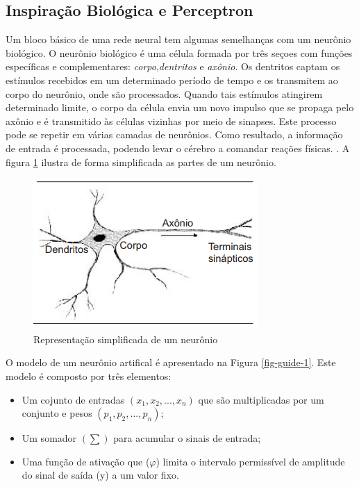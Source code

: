 \subsection{Inspiração Biológica e Perceptron}

Um bloco básico de uma rede neural tem algumas semelhanças com um neurônio biológico. O neurônio biológico é uma célula formada por três seçoes com funções específicas e complementares: \textit{corpo},\textit{dentritos} e \textit{axônio}. Os dentritos captam os estímulos recebidos em um determinado período de tempo e os transmitem ao corpo do neurônio, onde são processados. Quando tais estímulos atingirem determinado limite, o corpo da célula envia um novo impulso que se propaga pelo axônio e é transmitido às células vizinhas por meio de sinapses.  Este processo pode se repetir em várias camadas de neurônios. Como resultado, a informação de entrada é processada, podendo levar o cérebro a comandar reações físicas.  \cite{ferneda2006}. A figura \ref{fig-neuronio} ilustra de forma simplificada as partes de um neurônio.

\begin{figure}[h]
	\centering
	\includegraphics[scale=0.5]{pasta1_figuras/neuronio.png}
	\caption{Representação simplificada de um neurônio}
	\label{fig-neuronio}
\end{figure}

O modelo de um neurônio artifical é apresentado na Figura \ref{fig-guide-1}. Este modelo é composto por três elementos:
\begin{itemize}
	\item Um cojunto de entradas $(x_1,x_2,...,x_n)$ que são multiplicadas por um conjunto e pesos $(p_1,p_2,...,p_n)$;
	\item Um somador $(\sum)$ para acumular o sinais de entrada;
	\item Uma função de ativação que ($\varphi$) limita o intervalo permissível de amplitude do sinal de saída (y) a um valor fixo.
\end{itemize}

